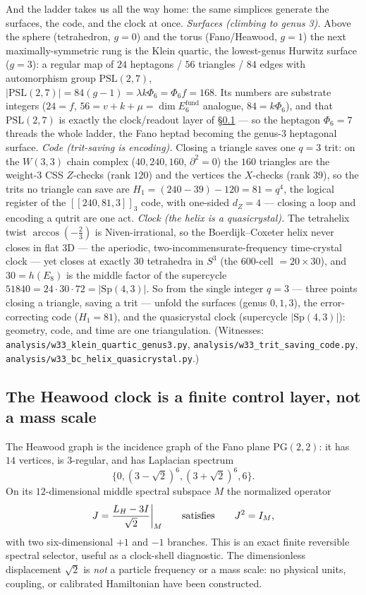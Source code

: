 \documentclass[11pt]{article}
\begin{document}
And the ladder takes us all the way home: the same simplices generate the surfaces,
the code, and the clock at once. \emph{Surfaces (climbing to genus 3).} Above the
sphere (tetrahedron, $g=0$) and the torus (Fano/Heawood, $g=1$) the next
maximally-symmetric rung is the Klein quartic, the lowest-genus Hurwitz surface
($g=3$): a regular map of $24$ heptagons / $56$ triangles / $84$ edges with
automorphism group $\mathrm{PSL}(2,7)$, $\lvert\mathrm{PSL}(2,7)\rvert=84(g-1)=\lambda k\Phi_6=\Phi_6 f=168$.
Its numbers are substrate integers ($24=f$, $56=v{+}k{+}\mu=\dim E_6^{\text{fund}}$
analogue, $84=k\Phi_6$), and that $\mathrm{PSL}(2,7)$ is exactly the clock/readout
layer of \S\ref{sec:clock-is-mass} --- so the heptagon $\Phi_6=7$ threads the whole
ladder, the Fano heptad becoming the genus-$3$ heptagonal surface.
\emph{Code (trit-saving is encoding).} Closing a triangle saves one $q=3$ trit: on
the $W(3,3)$ chain complex ($40,240,160$, $\partial^2=0$) the $160$ triangles are the
weight-$3$ CSS $Z$-checks (rank $120$) and the vertices the $X$-checks (rank $39$),
so the trits no triangle can save are $H_1=(240{-}39){-}120=81=q^4$, the logical
register of the $[[240,81,3]]_3$ code, with one-sided $d_Z=4$ --- closing a loop and encoding a qutrit are
one act. \emph{Clock (the helix is a quasicrystal).} The tetrahelix twist
$\arccos(-\tfrac23)$ is Niven-irrational, so the Boerdijk--Coxeter helix never
closes in flat $3$D --- the aperiodic, two-incommensurate-frequency time-crystal
clock --- yet closes at exactly $30$ tetrahedra in $S^3$ (the $600$-cell $=20\times30$),
and $30=h(E_8)$ is the middle factor of the supercycle $51840=24\cdot30\cdot72=\lvert\mathrm{Sp}(4,3)\rvert$.
So from the single integer $q=3$ --- three points closing a triangle, saving a trit
--- unfold the surfaces (genus $0,1,3$), the error-correcting code ($H_1=81$), and
the quasicrystal clock (supercycle $\lvert\mathrm{Sp}(4,3)\rvert$): geometry, code,
and time are one triangulation. (Witnesses:
\texttt{analysis/w33\_klein\_quartic\_genus3.py},
\texttt{analysis/w33\_trit\_saving\_code.py},
\texttt{analysis/w33\_bc\_helix\_quasicrystal.py}.)

\subsection{The Heawood clock is a finite control layer, not a mass scale}
\label{sec:clock-is-mass}

The Heawood graph is the incidence graph of the Fano plane
$\mathrm{PG}(2,2)$: it has $14$ vertices, is $3$-regular, and has Laplacian
spectrum
\[
  \{0,(3-\sqrt2)^6,(3+\sqrt2)^6,6\}.
\]
On its $12$-dimensional middle spectral subspace $M$ the normalized operator
\[
  J=\frac{L_H-3I}{\sqrt2}\bigg|_M
  \qquad\hbox{satisfies}\qquad J^2=I_M,
\]
with two six-dimensional $+1$ and $-1$ branches.  This is an exact finite
reversible spectral selector, useful as a clock-shell diagnostic.  The
dimensionless displacement $\sqrt2$ is \emph{not} a particle frequency or a
mass scale: no physical units, coupling, or calibrated Hamiltonian have been
constructed.
\end{document}
